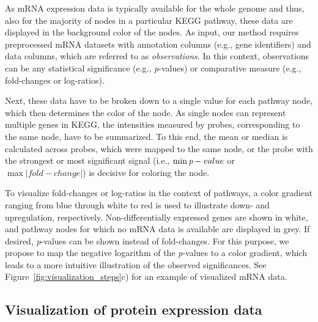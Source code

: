 \documentclass{bioinfo}
\begin{document}
As mRNA expression data is typically available for the whole genome and thus, also for the majority
of nodes in a particular KEGG pathway, these data are displayed in the background color of the
nodes.
%
As input, our method requires preprocessed mRNA datasets with annotation columns (e.g.,
gene identifiers) and data columns, which are referred to as \emph{observations}. In this context,
observations can be any statistical significance (e.g., \emph{p}-values) or comparative measure
(e.g., fold-changes or log-ratios).

Next, these data have to be broken down to a single value for each pathway node, which then
determines the color of the node. As single nodes can represent multiple genes in KEGG, the
intensities measured by probes, corresponding to the same node, have to be summarized. To this end,
the mean or median is calculated across probes, which were mapped to the same node, or the probe
with the strongest or most significant signal (i.e., $\min\emph{p}-value$ or $\max|fold-change|$) is
decisive for coloring the node.

To visualize fold-changes or log-ratios in the context of pathways, a color gradient ranging from
blue through white to red is used to illustrate down- and upregulation,
respectively. Non-differentially expressed genes are shown in white, and pathway nodes for which no
mRNA data is available are displayed in grey. If desired, \emph{p}-values can be shown instead of
fold-changes. For this purpose, we propose to map the negative logarithm of the \emph{p}-values to a
color gradient, which leads to a more intuitive illustration of the observed significances.  See
Figure~\ref{fig:visualization_steps}c) for an example of visualized mRNA data.


\subsection{Visualization of protein expression data}
\end{document}
